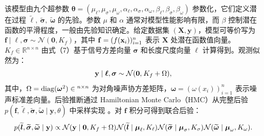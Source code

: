 \documentclass[]{interact}
\theoremstyle{plain}%
\theoremstyle{definition}
\theoremstyle{remark}
\begin{document}
该模型由九个超参数 ${\boldsymbol{\theta}} = ({\mu _\ell },{\mu _\sigma },{\mu _\omega },{\alpha _\ell },{\alpha _\sigma },{\alpha _\omega },{\beta _\ell },{\beta _\sigma },{\beta _\omega })$ 参数化，它们定义潜在过程 $\widetilde{\boldsymbol{\ell}},\ \widetilde{\boldsymbol{\sigma}},\ \widetilde{\boldsymbol{\omega}}$ 的先验。参数 $\mu$ 和 $\alpha$ 通常对模型性能影响有限，而 $\beta$ 控制潜在函数的平滑程度，一般由先验知识确定。给定数据集 $(\mathbf{X}, \mathbf{y})$，模型可等价写为 $\mathbf{f} \mid \boldsymbol{\ell}, \boldsymbol{\sigma} \sim \mathcal{N}(\mathbf{0}, K_{f})$，其中 $\mathbf{f} = (f({\bf{x}}_{i}))_{i=1}^{n}$ 表示 $\mathbf{X}$ 处潜在函数值向量。$K_{f} \in \mathbb{R}^{n \times n}$ 由式（7）基于信号方差向量 $\boldsymbol{\sigma}$ 和长度尺度向量 $\boldsymbol{\ell}$ 计算得到。观测似然为：
\begin{equation}
	{\bf{y}}\mid {\boldsymbol{\ell}},{\boldsymbol{\sigma}}\sim{\cal N}({\bf{0}},{\mkern 1mu} {K_f} + \Omega ),
\end{equation}
其中，$\Omega  = {\mathop{\rm diag}\nolimits} ({{\boldsymbol{\omega }}^2}) \in {^{n \times n}}$ 为对角噪声协方差矩阵，$\boldsymbol{\omega}=(\omega(x_i))_{i=1}^n$ 表示噪声标准差向量。后验推断通过 Hamiltonian Monte Carlo（HMC）从完整后验 $p(\mathbf{f}, \tilde{\boldsymbol{\ell}}, \tilde{\boldsymbol{\sigma}}, \tilde{\boldsymbol{\omega}} \mid \mathbf{y}, \theta)$ 中采样实现 \citep{Gelman2013, Hoffman2014}。对 $\mathbf{f}$ 积分可得到联合后验：
\begin{equation}
	p(\widetilde{\boldsymbol{l}},\widetilde{\boldsymbol{\sigma}},\widetilde{\boldsymbol{\omega}}\mid {\bf{y}}) 
	\propto 
	\mathcal{N}({\bf{y}}\mid {\bf{0}},{K_f} + \Omega ){\mkern 1mu} 
	\mathcal{N}(\widetilde{\boldsymbol{l}}\mid {\boldsymbol{\mu}}_\ell ,{K_\ell}){\mkern 1mu} 
	\mathcal{N}(\widetilde{\boldsymbol{\sigma}}\mid {\boldsymbol{\mu}}_\sigma ,{K_\sigma}){\mkern 1mu} 
	\mathcal{N}(\widetilde{\boldsymbol{\omega}}\mid {\boldsymbol{\mu}}_\omega ,{K_\omega}).
\end{equation}
\end{document}
